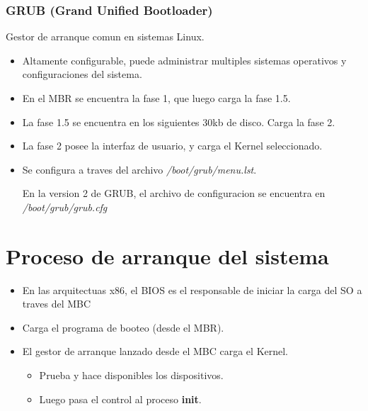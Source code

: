 \documentclass[11pt]{article}
\begin{document}
\begin{itemize}
        \subsubsection{GRUB (Grand Unified Bootloader)}
        Gestor de arranque comun en sistemas Linux. 
        \begin{itemize}
            \item Altamente configurable, puede administrar multiples sistemas operativos y configuraciones del sistema.
            \item En el MBR se encuentra la fase 1, que luego carga la fase 1.5.
            \item La fase 1.5 se encuentra en los siguientes 30kb de disco. Carga la fase 2.
            \item La fase 2 posee la interfaz de usuario, y carga el Kernel seleccionado.
            \item Se configura a traves del archivo \textit{/boot/grub/menu.lst}.

                En la version 2 de GRUB, el archivo de configuracion se encuentra en \textit{/boot/grub/grub.cfg}
        \end{itemize}
\end{itemize}

\section{Proceso de arranque del sistema}
\begin{itemize}
    \item En las arquitectuas x86, el BIOS es el responsable de iniciar la carga del SO a traves del MBC
    \item Carga el programa de booteo (desde el MBR).
    \item El gestor de arranque lanzado desde el MBC carga el Kernel.
        \begin{itemize}
            \item Prueba y hace disponibles los dispositivos.
            \item Luego pasa el control al proceso \textbf{init}.
        \end{itemize}
\end{itemize}
\end{document}
